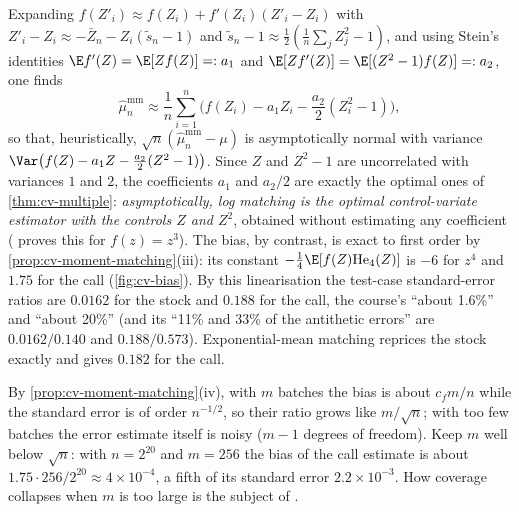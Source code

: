 \begin{remark}\label{rem:cv-mm-as-cv}
Expanding $f(Z'_i)\approx f(Z_i)+f'(Z_i)(Z'_i-Z_i)$ with
$Z'_i-Z_i\approx-\bar Z_n-Z_i(\tilde s_n-1)$ and $\tilde s_n-1\approx\frac12(\frac1n\sum_jZ_j^2-1)$,
and using Stein's identities $\E f'(Z)=\E[Zf(Z)]=:a_1$ and
$\E[Zf'(Z)]=\E[(Z^2-1)f(Z)]=:a_2$, one finds
\[
  \hat\mu^{\mathrm{mm}}_n\approx\frac1n\sum_{i=1}^n\Big(f(Z_i)-a_1Z_i-\frac{a_2}{2}(Z_i^2-1)\Big),
\]
so that, heuristically, $\sqrt n(\hat\mu^{\mathrm{mm}}_n-\mu)$ is asymptotically normal with variance
$\Var\big(f(Z)-a_1Z-\frac{a_2}2(Z^2-1)\big)$. Since $Z$ and $Z^2-1$ are uncorrelated with
variances $1$ and $2$, the coefficients $a_1$ and $a_2/2$ are exactly the optimal ones of
\cref{thm:cv-multiple}: \emph{asymptotically, log matching is the optimal control-variate
estimator with the controls $Z$ and $Z^2$}, obtained without estimating any coefficient
( proves this for $f(z)=z^3$). The bias, by contrast, is exact to first
order by \cref{prop:cv-moment-matching}(iii): its constant $-\frac14\E[f(Z)\mathrm{He}_4(Z)]$ is
$-6$ for $z^4$ and $1.75$ for the call (\cref{fig:cv-bias}). By this linearisation the test-case
standard-error ratios are $0.0162$ for the stock and $0.188$ for the call, the course's ``about 1.6\%'' and ``about 20\%'' (and its ``11\% and 33\% of the
antithetic errors'' are $0.0162/0.140$ and $0.188/0.573$). Exponential-mean matching
reprices the stock exactly and gives $0.182$ for the call.
\end{remark}

\begin{remark}\label{rem:cv-mm-batches}
By \cref{prop:cv-moment-matching}(iv), with $m$ batches the bias is about $c_fm/n$ while the
standard error is of order $n^{-1/2}$, so their ratio grows like $m/\sqrt n$; with too few
batches the error estimate itself is noisy ($m-1$ degrees of freedom). Keep $m$ well below
$\sqrt n$: with $n=2^{20}$ and $m=256$ the bias of the call estimate is about
$1.75\cdot256/2^{20}\approx4\times10^{-4}$, a fifth of its standard error $2.2\times10^{-3}$.
How coverage collapses when $m$ is too large is the subject of .
\end{remark}

